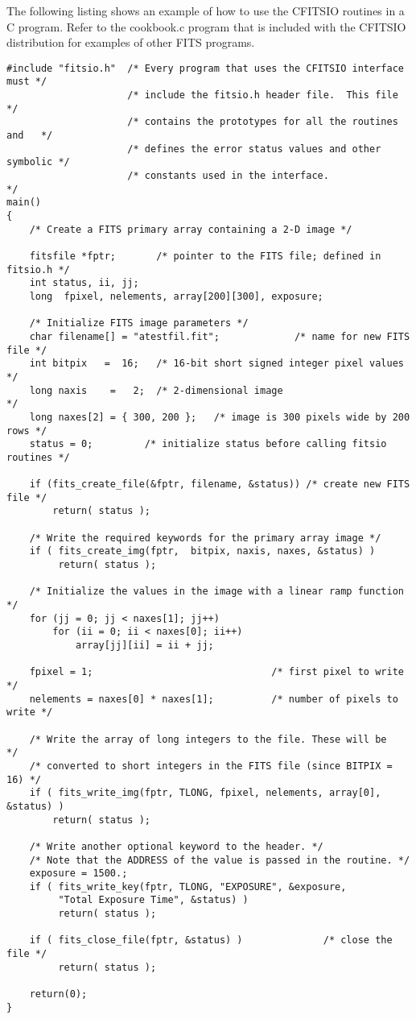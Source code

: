 The following listing shows an example of how to use the CFITSIO
routines in a C program.  Refer to the cookbook.c program that
is included with the CFITSIO distribution for examples of other
FITS programs.


\begin{verbatim}
#include "fitsio.h"  /* Every program that uses the CFITSIO interface must */
                     /* include the fitsio.h header file.  This file       */
                     /* contains the prototypes for all the routines and   */
                     /* defines the error status values and other symbolic */
                     /* constants used in the interface.                   */
main()
{
    /* Create a FITS primary array containing a 2-D image */

    fitsfile *fptr;       /* pointer to the FITS file; defined in fitsio.h */
    int status, ii, jj;
    long  fpixel, nelements, array[200][300], exposure;

    /* Initialize FITS image parameters */
    char filename[] = "atestfil.fit";             /* name for new FITS file */
    int bitpix   =  16;   /* 16-bit short signed integer pixel values       */
    long naxis    =   2;  /* 2-dimensional image                            */
    long naxes[2] = { 300, 200 };   /* image is 300 pixels wide by 200 rows */
    status = 0;         /* initialize status before calling fitsio routines */

    if (fits_create_file(&fptr, filename, &status)) /* create new FITS file */
        return( status );

    /* Write the required keywords for the primary array image */
    if ( fits_create_img(fptr,  bitpix, naxis, naxes, &status) )
         return( status );

    /* Initialize the values in the image with a linear ramp function */
    for (jj = 0; jj < naxes[1]; jj++)
        for (ii = 0; ii < naxes[0]; ii++)
            array[jj][ii] = ii + jj;

    fpixel = 1;                               /* first pixel to write      */
    nelements = naxes[0] * naxes[1];          /* number of pixels to write */

    /* Write the array of long integers to the file. These will be      */
    /* converted to short integers in the FITS file (since BITPIX = 16) */
    if ( fits_write_img(fptr, TLONG, fpixel, nelements, array[0], &status) )
        return( status );

    /* Write another optional keyword to the header. */
    /* Note that the ADDRESS of the value is passed in the routine. */
    exposure = 1500.;
    if ( fits_write_key(fptr, TLONG, "EXPOSURE", &exposure,
         "Total Exposure Time", &status) )
         return( status );

    if ( fits_close_file(fptr, &status) )              /* close the file */
         return( status );

    return(0);
}
\end{verbatim}

